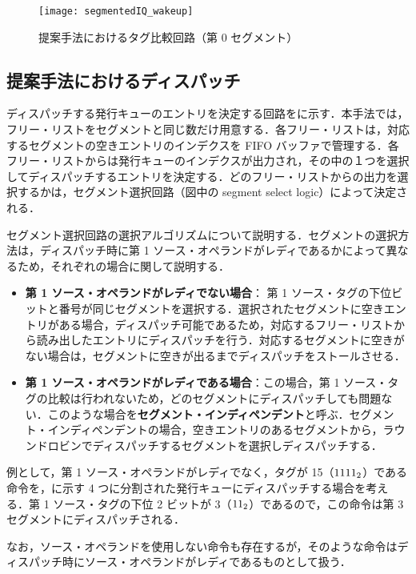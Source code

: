 \begin{figure*}[htb]
  \centering
  \texttt{[image: segmentedIQ\_wakeup]}
  \caption{提案手法におけるタグ比較回路（第 0 セグメント）}
  \label{fig:segmentedIQ_wakeup}
\end{figure*}

\subsection{提案手法におけるディスパッチ}
ディスパッチする発行キューのエントリを決定する回路をに示す．本手法では，フリー・リストをセグメントと同じ数だけ用意する．各フリー・リストは，対応するセグメントの空きエントリのインデクスを FIFO バッファで管理する．各フリー・リストからは発行キューのインデクスが出力され，その中の１つを選択してディスパッチするエントリを決定する．どのフリー・リストからの出力を選択するかは，セグメント選択回路（図中の segment select logic）によって決定される．

セグメント選択回路の選択アルゴリズムについて説明する．セグメントの選択方法は，ディスパッチ時に第 1 ソース・オペランドがレディであるかによって異なるため，それぞれの場合に関して説明する．
\begin{itemize}
  \item \textbf{第 1 ソース・オペランドがレディでない場合}： 第 1 ソース・タグの下位ビットと番号が同じセグメントを選択する．選択されたセグメントに空きエントリがある場合，ディスパッチ可能であるため，対応するフリー・リストから読み出したエントリにディスパッチを行う．対応するセグメントに空きがない場合は，セグメントに空きが出るまでディスパッチをストールさせる．
  \item \textbf{第 1 ソース・オペランドがレディである場合}：この場合，第 1 ソース・タグの比較は行われないため，どのセグメントにディスパッチしても問題ない．このような場合を\textbf{セグメント・インディペンデント}と呼ぶ．セグメント・インディペンデントの場合，空きエントリのあるセグメントから，ラウンドロビンでディスパッチするセグメントを選択しディスパッチする．
\end{itemize}
例として，第 1 ソース・オペランドがレディでなく，タグが 15（${\rm 1111_2}$）である命令を，に示す 4 つに分割された発行キューにディスパッチする場合を考える．第 1 ソース・タグの下位 2 ビットが 3（${\rm 11_2}$）であるので，この命令は第 3 セグメントにディスパッチされる．　

なお，ソース・オペランドを使用しない命令も存在するが，そのような命令はディスパッチ時にソース・オペランドがレディであるものとして扱う．


